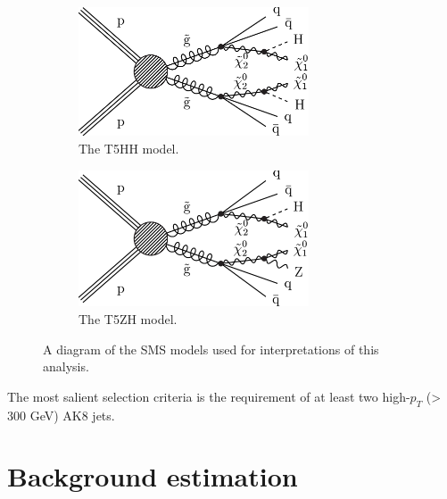 \begin{figure}[htbp]
\begin{subfigure}[b]{0.5\textwidth}
\begin{centering}
\includegraphics[width=0.75\textwidth]{figs/T5HH.pdf}
\caption{The T5HH model.}
\end{centering}
\end{subfigure}
\begin{subfigure}[b]{0.5\textwidth}
\begin{centering}
\includegraphics[width=0.75\textwidth]{figs/T5ZH.pdf}
\caption{The T5ZH model.}
\end{centering}
\end{subfigure}
\caption{A diagram of the SMS models used for interpretations of this analysis.}
\label{fig:sms}
\end{figure}

The most salient selection criteria is the requirement of at least two high-$p_{T}$ (> 300 GeV) AK8 jets.

\section{Background estimation}

